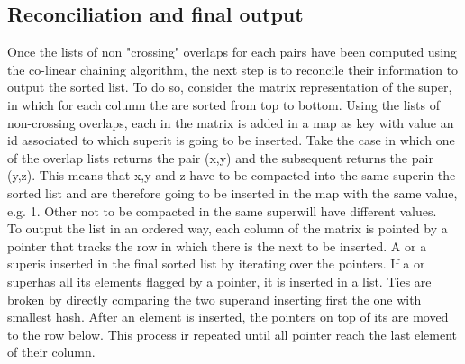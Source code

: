 \subsection{Reconciliation and final output}
Once the lists of non "crossing" overlaps for each pairs have been computed using the co-linear chaining algorithm, the next step is to reconcile their information to output the sorted list. To do so, consider the matrix representation of the super\kmers, in which for each column the \kmers are sorted from top to bottom. Using the lists of non-crossing overlaps, each \kmer in the matrix is added in a map as key with value an id associated to which super\kmer it is going to be inserted. Take the case in which one of the overlap lists returns the pair (x,y) and the subsequent returns the pair (y,z). This means that \kmers x,y and z have to be compacted into the same super\kmer in the sorted list and are therefore going to be inserted in the map with the same value, e.g. 1. Other \kmers not to be compacted in the same super\kmer will have different values.\\
To output the list in an ordered way, each column of the matrix is pointed by a pointer that tracks the row in which there is the next \kmer to be inserted. A \kmer or a super\kmer is inserted in the final sorted list by iterating over the pointers. If a \kmer or super\kmer has all its elements flagged by a pointer, it is inserted in a list. Ties are broken by directly comparing the two super\kmers and inserting first the one with smallest hash. After an element is inserted, the pointers on top of its \kmers are moved to the row below. This process ir repeated until all pointer reach the last element of their column.\\

